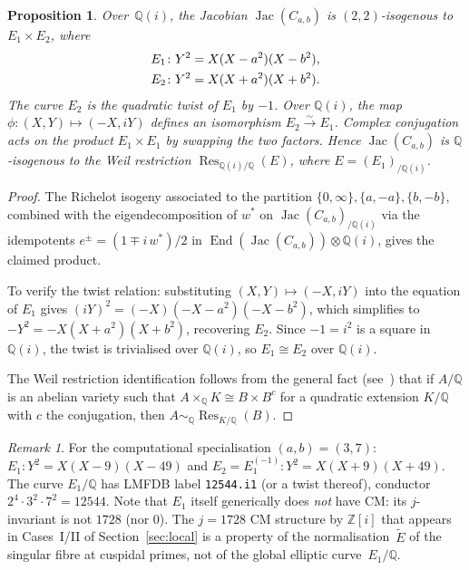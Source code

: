 \documentclass[11pt,a4paper]{article}
\newcommand{\Jac}{\operatorname{Jac}}
\newcommand{\End}{\operatorname{End}}
\newcommand{\Res}{\operatorname{Res}}
\newtheorem{proposition}[theorem]{Proposition}
\theoremstyle{definition}
\theoremstyle{remark}
\newtheorem{remark}[theorem]{Remark}
\begin{document}
\begin{proposition}\label{prop:weil}
  Over~$\mathbb{Q}(i)$, the Jacobian $\Jac(C_{a,b})$ is
  $(2,2)$-isogenous to $E_1 \times E_2$, where
  \begin{align}\label{eq:E1E2}
    E_1 &\colon Y^2 = X(X - a^2)(X - b^2), \\
    E_2 &\colon Y^2 = X(X + a^2)(X + b^2). \notag
  \end{align}
  The curve $E_2$ is the quadratic twist of $E_1$ by $-1$.
  Over $\mathbb{Q}(i)$, the map $\phi\colon (X,Y) \mapsto (-X, iY)$
  defines an isomorphism $E_2 \xrightarrow{\sim} E_1$.
  Complex conjugation acts on the product $E_1 \times E_1$ by
  swapping the two factors.
  Hence $\Jac(C_{a,b})$ is $\mathbb{Q}$-isogenous to the
  Weil restriction $\Res_{\mathbb{Q}(i)/\mathbb{Q}}(E)$,
  where $E = (E_1)_{/\mathbb{Q}(i)}$.
\end{proposition}

\begin{proof}
  The Richelot isogeny associated to the partition
  $\{0, \infty\}, \{a, -a\}, \{b, -b\}$, combined with the
  eigendecomposition of $w^*$ on $\Jac(C_{a,b})_{/\mathbb{Q}(i)}$
  via the idempotents $e^\pm = (1 \mp i\, w^*)/2$
  in $\End(\Jac(C_{a,b})) \otimes \mathbb{Q}(i)$,
  gives the claimed product.

  To verify the twist relation:
  substituting $(X, Y) \mapsto (-X, iY)$ into the equation of $E_1$
  gives $(iY)^2 = (-X)(-X - a^2)(-X - b^2)$, which simplifies to
  $-Y^2 = -X(X + a^2)(X + b^2)$, recovering $E_2$.
  Since $-1 = i^2$ is a square in $\mathbb{Q}(i)$, the twist
  is trivialised over $\mathbb{Q}(i)$, so $E_1 \cong E_2$ over
  $\mathbb{Q}(i)$.

  The Weil restriction identification follows from the general
  fact (see~\cite[Prop.~1.3]{MilneAV}) that if
  $A/\mathbb{Q}$ is an abelian variety such that
  $A \times_{\mathbb{Q}} K \cong B \times B^c$ for a
  quadratic extension $K/\mathbb{Q}$ with $c$ the conjugation,
  then $A \sim_{\mathbb{Q}} \Res_{K/\mathbb{Q}}(B)$.
\end{proof}

\begin{remark}\label{rem:explicitE}
  For the computational specialisation $(a,b) = (3,7)$:
  $E_1\colon Y^2 = X(X-9)(X-49)$ and
  $E_2 = E_1^{(-1)}\colon Y^2 = X(X+9)(X+49)$.
  The curve $E_1/\mathbb{Q}$ has LMFDB label \texttt{12544.i1}
  (or a twist thereof), conductor $2^4 \cdot 3^2 \cdot 7^2 = 12544$.
  Note that $E_1$ itself generically does \emph{not} have CM:
  its $j$-invariant is not $1728$ (nor $0$).
  The $j = 1728$ CM structure by $\mathbb{Z}[i]$ that appears in
  Cases~I/II of Section~\ref{sec:local} is a property of the
  normalisation~$\tilde{E}$ of the singular fibre at cuspidal primes,
  not of the global elliptic curve~$E_1/\mathbb{Q}$.
\end{remark}
\end{document}
